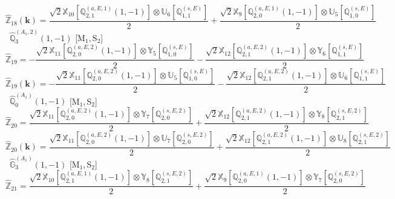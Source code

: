 \documentclass[fleqn,10pt,landscape]{article}
\begin{document}
\begin{itemize}
\begin{dmath*}
\end{dmath*}
\begin{dmath*}
\hat{\mathbb{Z}}_{18}(\bm{k})=\frac{\sqrt{2} \mathbb{X}_{10}[\mathbb{Q}_{2,1}^{(a,E,1)}(1,-1)] \otimes\mathbb{U}_{6}[\mathbb{Q}_{1,1}^{(s,E)}]}{2} + \frac{\sqrt{2} \mathbb{X}_{9}[\mathbb{Q}_{2,0}^{(a,E,1)}(1,-1)] \otimes\mathbb{U}_{5}[\mathbb{Q}_{1,0}^{(s,E)}]}{2}
\end{dmath*}
\vspace{4mm}
\noindent {} $\,\,\,\hat{\mathbb{Q}}_{3}^{(A_{1},2)}(1,-1)$ [M$_{1}$,\,S$_{2}$]
\begin{dmath*}
\hat{\mathbb{Z}}_{19}=- \frac{\sqrt{2} \mathbb{X}_{11}[\mathbb{Q}_{2,0}^{(a,E,2)}(1,-1)] \otimes\mathbb{Y}_{5}[\mathbb{Q}_{1,0}^{(s,E)}]}{2} - \frac{\sqrt{2} \mathbb{X}_{12}[\mathbb{Q}_{2,1}^{(a,E,2)}(1,-1)] \otimes\mathbb{Y}_{6}[\mathbb{Q}_{1,1}^{(s,E)}]}{2}
\end{dmath*}
\begin{dmath*}
\hat{\mathbb{Z}}_{19}(\bm{k})=- \frac{\sqrt{2} \mathbb{X}_{11}[\mathbb{Q}_{2,0}^{(a,E,2)}(1,-1)] \otimes\mathbb{U}_{5}[\mathbb{Q}_{1,0}^{(s,E)}]}{2} - \frac{\sqrt{2} \mathbb{X}_{12}[\mathbb{Q}_{2,1}^{(a,E,2)}(1,-1)] \otimes\mathbb{U}_{6}[\mathbb{Q}_{1,1}^{(s,E)}]}{2}
\end{dmath*}
\vspace{4mm}
\noindent {} $\,\,\,\hat{\mathbb{Q}}_{0}^{(A_{1})}(1,-1)$ [M$_{1}$,\,S$_{2}$]
\begin{dmath*}
\hat{\mathbb{Z}}_{20}=\frac{\sqrt{2} \mathbb{X}_{11}[\mathbb{Q}_{2,0}^{(a,E,2)}(1,-1)] \otimes\mathbb{Y}_{7}[\mathbb{Q}_{2,0}^{(s,E,2)}]}{2} + \frac{\sqrt{2} \mathbb{X}_{12}[\mathbb{Q}_{2,1}^{(a,E,2)}(1,-1)] \otimes\mathbb{Y}_{8}[\mathbb{Q}_{2,1}^{(s,E,2)}]}{2}
\end{dmath*}
\begin{dmath*}
\hat{\mathbb{Z}}_{20}(\bm{k})=\frac{\sqrt{2} \mathbb{X}_{11}[\mathbb{Q}_{2,0}^{(a,E,2)}(1,-1)] \otimes\mathbb{U}_{7}[\mathbb{Q}_{2,0}^{(s,E,2)}]}{2} + \frac{\sqrt{2} \mathbb{X}_{12}[\mathbb{Q}_{2,1}^{(a,E,2)}(1,-1)] \otimes\mathbb{U}_{8}[\mathbb{Q}_{2,1}^{(s,E,2)}]}{2}
\end{dmath*}
\vspace{4mm}
\noindent {} $\,\,\,\hat{\mathbb{G}}_{3}^{(A_{1})}(1,-1)$ [M$_{1}$,\,S$_{2}$]
\begin{dmath*}
\hat{\mathbb{Z}}_{21}=\frac{\sqrt{2} \mathbb{X}_{10}[\mathbb{Q}_{2,1}^{(a,E,1)}(1,-1)] \otimes\mathbb{Y}_{8}[\mathbb{Q}_{2,1}^{(s,E,2)}]}{2} + \frac{\sqrt{2} \mathbb{X}_{9}[\mathbb{Q}_{2,0}^{(a,E,1)}(1,-1)] \otimes\mathbb{Y}_{7}[\mathbb{Q}_{2,0}^{(s,E,2)}]}{2}

\end{dmath*}
\end{itemize}
\end{document}
